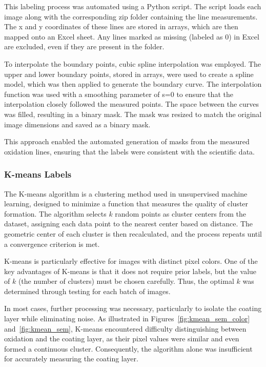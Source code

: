 This labeling process was automated using a Python script. The script loads each image along with the corresponding zip folder containing the line measurements. The x and y coordinates of these lines are stored in arrays, which are then mapped onto an Excel sheet. Any lines marked as missing (labeled as 0) in Excel are excluded, even if they are present in the folder.

To interpolate the boundary points, cubic spline interpolation \cite{fritsch1980monotone} was employed. The upper and lower boundary points, stored in arrays, were used to create a spline model, which was then applied to generate the boundary curve. The interpolation function was used with a smoothing parameter of s=0 to ensure that the interpolation closely followed the measured points. The space between the curves was filled, resulting in a binary mask. The mask was resized to match the original image dimensions and saved as a binary mask.

This approach enabled the automated generation of masks from the measured oxidation lines, ensuring that the labels were consistent with the scientific data.



\subsubsection{K-means Labels} \label{sec:kmeans}

The K-means algorithm \cite{lloyd1982least} is a clustering method used in unsupervised machine learning, designed to minimize a function that measures the quality of cluster formation. The algorithm selects $k$ random points as cluster centers from the dataset, assigning each data point to the nearest center based on distance. The geometric center of each cluster is then recalculated, and the process repeats until a convergence criterion is met.

K-means is particularly effective for images with distinct pixel colors. One of the key advantages of K-means is that it does not require prior labels, but the value of $k$ (the number of clusters) must be chosen carefully. Thus, the optimal $k$ was determined through testing for each batch of images.

In most cases, further processing was necessary, particularly to isolate the coating layer while eliminating noise. As illustrated in Figures~\ref{fig:kmean_sem_color} and~\ref{fig:kmean_sem}, K-means encountered difficulty distinguishing between oxidation and the coating layer, as their pixel values were similar and even formed a continuous cluster. Consequently, the algorithm alone was insufficient for accurately measuring the coating layer.

